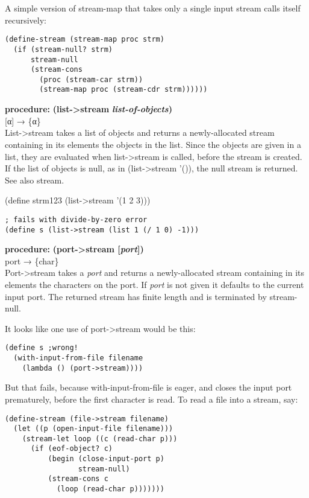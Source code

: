 A simple version of stream-map that takes only a single input stream
calls itself recursively:

\begin{verbatim}
(define-stream (stream-map proc strm)
  (if (stream-null? strm)
      stream-null
      (stream-cons
        (proc (stream-car strm))
        (stream-map proc (stream-cdr strm))))))
\end{verbatim}

\textbf{procedure:} \textbf{(list-\textgreater{}stream}
\textbf{\emph{list-of-objects})}\\
{[}α{]} → \{α\}\\
List-\textgreater{}stream takes a list of objects and returns a
newly-allocated stream containing in its elements the objects in the
list. Since the objects are given in a list, they are evaluated when
list-\textgreater{}stream is called, before the stream is created. If
the list of objects is null, as in (list-\textgreater{}stream '()), the
null stream is returned. See also stream.

(define strm123 (list-\textgreater{}stream '(1 2 3)))

\begin{verbatim}
; fails with divide-by-zero error
(define s (list->stream (list 1 (/ 1 0) -1)))
\end{verbatim}

\textbf{procedure:} \textbf{(port-\textgreater{}stream
{[}\emph{port}{]})}\\
port → \{char\}\\
Port-\textgreater{}stream takes a \emph{port} and returns a
newly-allocated stream containing in its elements the characters on the
port. If \emph{port} is not given it defaults to the current input port.
The returned stream has finite length and is terminated by stream-null.

It looks like one use of port-\textgreater{}stream would be this:

\begin{verbatim}
(define s ;wrong!
  (with-input-from-file filename
    (lambda () (port->stream))))
\end{verbatim}

But that fails, because with-input-from-file is eager, and closes the
input port prematurely, before the first character is read. To read a
file into a stream, say:

\begin{verbatim}
(define-stream (file->stream filename)
  (let ((p (open-input-file filename)))
    (stream-let loop ((c (read-char p)))
      (if (eof-object? c)
          (begin (close-input-port p)
                 stream-null)
          (stream-cons c
            (loop (read-char p)))))))
\end{verbatim}

